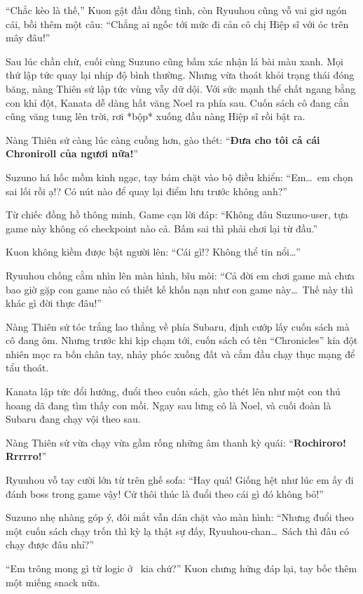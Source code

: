 \documentclass[../main.tex]{subfiles}
\begin{document}
``Chắc kèo là thế,'' Kuon gật đầu đồng tình, còn Ryuuhou cũng vỗ vai giơ ngón cái, bồi thêm một câu: ``Chẳng ai ngốc tới mức đi cản cô chị Hiệp sĩ với óc trên mây đâu!''

Sau lúc chần chừ, cuối cùng Suzuno cũng bấm xác nhận lá bài màu xanh. Mọi thứ lập tức quay lại nhịp độ bình thường. Nhưng vừa thoát khỏi trạng thái đóng băng, nàng Thiên sứ lập tức vùng vẫy dữ dội. Với sức mạnh thể chất ngang bằng con khỉ đột, Kanata dễ dàng hất văng Noel ra phía sau. Cuốn sách cô đang cắn cũng văng tung lên trời, rơi *bộp* xuống đầu nàng Hiệp sĩ rồi bật ra.

Nàng Thiên sứ càng lúc càng cuồng hơn, gào thét: ``\textbf{Đưa cho tôi cả cái Chroniroll của ngươi nữa!}''

Suzuno há hốc mồm kinh ngạc, tay bám chặt vào bộ điều khiển: ``Em\dots\ em chọn sai lối rồi ạ!? Có nút nào để quay lại điểm lưu trước không anh?''

Từ chiếc đồng hồ thông minh, Game cạn lời đáp: ``Không đâu Suzuno-user, tựa game này không có checkpoint nào cả. Bấm sai thì phải chơi lại từ đầu.''

Kuon không kiềm được bật người lên: ``Cái gì!? Không thể tin nổi\dots''

Ryuuhou chống cằm nhìn lên màn hình, bĩu môi: ``Cả đời em chơi game mà chưa bao giờ gặp con game nào có thiết kế khốn nạn như con game này\dots\ Thế này thì khác gì đời thực đâu!''

Nàng Thiên sứ tóc trắng lao thẳng về phía Subaru, định cướp lấy cuốn sách mà cô đang ôm. Nhưng trước khi kịp chạm tới, cuốn sách có tên ``Chronicles'' kia đột nhiên mọc ra bốn chân tay, nhảy phóc xuống đất và cắm đầu chạy thục mạng để tẩu thoát.

Kanata lập tức đổi hướng, đuổi theo cuốn sách, gào thét lên như một con thú hoang dã đang tìm thấy con mồi. Ngay sau lưng cô là Noel, và cuối đoàn là Subaru đang chạy vội theo sau.

Nàng Thiên sứ vừa chạy vừa gầm rống những âm thanh kỳ quái: ``\textbf{Rochiroro! Rrrrro!}''

Ryuuhou vỗ tay cười lớn từ trên ghế sofa: ``Hay quá! Giống hệt như lúc em ấy đi đánh boss trong game vậy! Cứ thôi thúc là đuổi theo cái gì đó không bỏ!''

Suzuno nhẹ nhàng góp ý, đôi mắt vẫn dán chặt vào màn hình: ``Nhưng đuổi theo một cuốn sách chạy trốn thì kỳ lạ thật sự đấy, Ryuuhou-chan\dots\ Sách thì đâu có chạy được đâu nhỉ?''

``Em trông mong gì từ logic ở \hll\ kia chứ?'' Kuon chưng hửng đáp lại, tay bốc thêm một miếng snack nữa.
\end{document}
